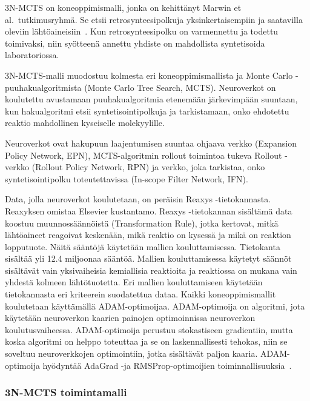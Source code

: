 \documentclass[finnish,twoside,censored,tkt,sw-line]{HYthesisML}
\begin{document}
3N-MCTS on koneoppimismalli, jonka on kehittänyt Marwin et al.\ tutkimusryhmä.
Se etsii retrosynteesipolkuja yksinkertaisempiin ja saatavilla oleviin lähtöaineisiin~\cite{SeglerMarwinHS2018Pcsw}.
Kun retrosynteesipolku on varmennettu ja todettu toimivaksi, niin syötteenä annettu yhdiste on mahdollista syntetisoida laboratoriossa.

3N-MCTS-malli muodostuu kolmesta eri koneoppimismallista ja Monte Carlo -puuhakualgoritmista (Monte Carlo Tree Search, MCTS).
Neuroverkot on koulutettu avustamaan puuhakualgoritmia etenemään järkevimpään suuntaan, kun hakualgoritmi etsii syntetisointipolkuja ja tarkistamaan, onko ehdotettu reaktio mahdollinen kyseiselle molekyylille.

Neuroverkot ovat hakupuun laajentumisen suuntaa ohjaava verkko (Expansion Policy Network, EPN), MCTS-algoritmin rollout toimintoa tukeva Rollout -verkko (Rollout Policy Network, RPN) ja verkko, joka tarkistaa, onko syntetisointipolku toteutettavissa (In-scope Filter Network, IFN).

Data, jolla neuroverkot koulutetaan, on peräisin Reaxys -tietokannasta.
Reaxyksen omistaa Elsevier kustantamo.
Reaxys -tietokannan sisältämä data koostuu muunnossäännöistä (Transformation Rule), jotka kertovat, mitkä lähtöaineet reagoivat keskenään, mikä reaktio on kysessä ja mikä on reaktion lopputuote.
Näitä sääntöjä käytetään mallien kouluttamisessa.
Tietokanta sisältää yli 12.4 miljoonaa sääntöä.
Mallien kouluttamisessa käytetyt säännöt sisältävät vain yksivaiheisia kemiallisia reaktioita ja reaktiossa on mukana vain yhdestä kolmeen lähtötuotetta.
Eri mallien kouluttamiseen käytetään tietokannasta eri kriteerein suodatettua dataa.
Kaikki koneoppimismallit koulutetaan käyttämällä ADAM-optimoijaa.
ADAM-optimoija on algoritmi, jota käytetään neuroverkon kaarien painojen optimoinnissa neuroverkon koulutusvaiheessa.
ADAM-optimoija perustuu stokastiseen gradientiin, mutta koska algoritmi on helppo toteuttaa ja se on laskennallisesti tehokas, niin se soveltuu neuroverkkojen optimointiin, jotka sisältävät paljon kaaria.
ADAM-optimoija hyödyntää AdaGrad -ja RMSProp-optimoijien toiminnallisuuksia~\cite{kingma2017adam}.

\subsubsection{3N-MCTS toimintamalli}
\end{document}
